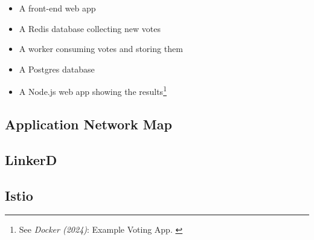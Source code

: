 \begin{itemize}
    \item A front-end web app
    \item A Redis database collecting new votes
    \item A worker consuming votes and storing them
    \item A Postgres database
    \item A Node.js web app showing the results\footnote{See \textit{Docker (2024)}: Example Voting App. \cite{votingGithub}}
\end{itemize}

\subsection{Application Network Map}

\subsection{LinkerD}

\subsection{Istio}

